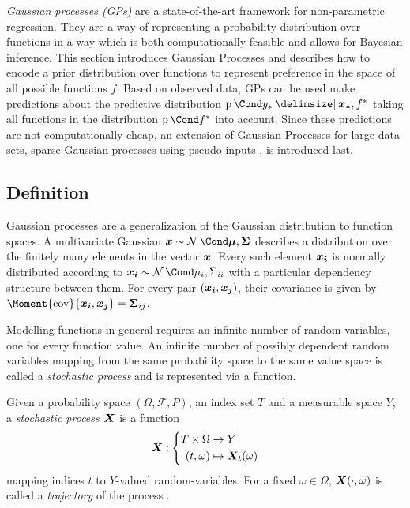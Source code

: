 \emph{Gaussian processes (GPs)} are a state-of-the-art framework for non-parametric regression.
They are a way of representing a probability distribution over functions in a way which is both computationally feasible and allows for Bayesian inference.
This section introduces Gaussian Processes and describes how to encode a prior distribution over functions to represent preference in the space of all possible functions $f$.
Based on observed data, GPs can be used make predictions about the predictive distribution $\Prob{y_\ast \given \mat{x_\ast}, f^\ast}$ taking all functions in the distribution $\Prob{f^\ast}$ into account.
Since these predictions are not computationally cheap, an extension of Gaussian Processes for large data sets, sparse Gaussian processes using pseudo-inputs \cite{snelson_sparse_2005}, is introduced last.

\subsection{Definition}
Gaussian processes are a generalization of the Gaussian distribution to function spaces.
A multivariate Gaussian $\mat{x} \sim \Gaussian{\mat{\mu}, \mat{\Sigma}}$ describes a distribution over the finitely many elements in the vector $\bm{x}$.
Every such element $\bm{x_i}$ is normally distributed according to $\rv{x_i} \sim \Gaussian{\mu_i, \Sigma_{ii}}$ with a particular dependency structure between them.
For every pair $(\bm{x_i}, \bm{x_j})$, their covariance is given by $\Moment{\cov}{\rv{x_i}, \rv{x_j}} = \mat{\Sigma}_{ij}$.

Modelling functions in general requires an infinite number of random variables, one for every function value.
An infinite number of possibly dependent random variables mapping from the same probability space to the same value space is called a \emph{stochastic process} and is represented via a function.

\begin{definition}
    \label{def:stochastic_process}
    Given a probability space $(\Omega, \mathcal{F}, P)$, an index set $T$ and a measurable space $Y$, a \emph{stochastic process $\bm{X}$} is a function
    \begin{align}
        \bm{X} : \left\{\begin{aligned}
            T \times \Omega &\to Y \\
            (t, \omega) &\mapsto \bm{X_t}(\omega)
        \end{aligned}\right.
    \end{align}
    mapping indices $t$ to $Y$-valued random-variables.
    For a fixed $\omega \in \Omega$, $\bm{X}(\cdot, \omega)$ is called a \emph{trajectory} of the process \cite{astrom_introduction_1971}.
\end{definition}

